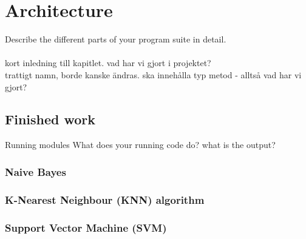 \chapter{Architecture}
Describe the different parts of your program suite in detail.
\\\\
kort inledning till kapitlet. vad har vi gjort i projektet?\\
trattigt namn, borde kanske ändras. ska innehålla typ metod - alltså vad har vi gjort?

\section{Finished work}
Running modules
What does your running code do? what is the output?

\subsection{Naive Bayes}

\subsection{K-Nearest Neighbour (KNN) algorithm}

\subsection{Support Vector Machine (SVM)}

